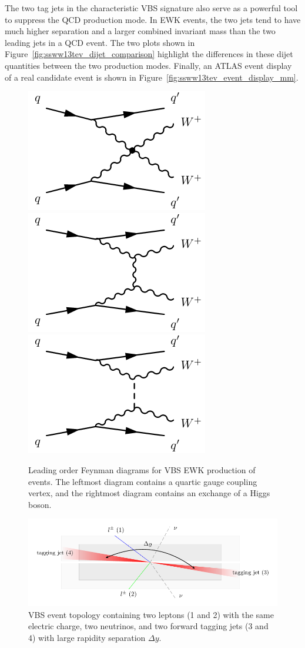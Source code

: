The two tag jets in the characteristic VBS signature also serve as a powerful tool to suppress the QCD production mode.
In EWK events, the two jets tend to have much higher separation and a larger combined invariant mass than the two leading jets in a QCD event.
The two plots shown in Figure~\ref{fig:ssww13tev_dijet_comparison} highlight the differences in these dijet quantities between the two production modes.
Finally, an ATLAS event display of a real \ssww candidate event is shown in Figure~\ref{fig:ssww13tev_event_display_mm}.

\begin{figure}[htbp]
  \centering
  \includegraphics[width=.32\textwidth]{figs/ssww_13tev/diagrams/vbs1}
  \includegraphics[width=.32\textwidth]{figs/ssww_13tev/diagrams/vbs2}
  \includegraphics[width=.32\textwidth]{figs/ssww_13tev/diagrams/vbs3}
  \caption{Leading order Feynman diagrams for VBS EWK production of \ssww events. The leftmost diagram contains a quartic gauge coupling vertex, and the rightmost diagram contains an exchange of a Higgs boson.}
  \label{fig:ssww13tev_diagrams_vbs_ssww}
\end{figure}

\begin{figure}[htbp]
  \centering
  \includegraphics[width=.95\textwidth]{figs/ssww_13tev/introduction/vbs_event_topology}
  \caption{\ssww VBS event topology containing two leptons (1 and 2) with the same electric charge, two neutrinos, and two forward tagging jets (3 and 4) with large rapidity separation $\Delta y$.}
  \label{fig:ssww13tev_event_topology}
\end{figure}

